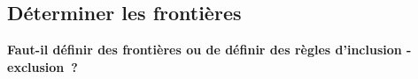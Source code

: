%

\subsection{Déterminer les frontières}

\textbf{Faut-il définir des frontières ou de définir des règles d'inclusion - exclusion~?}

